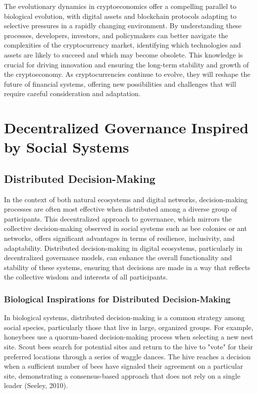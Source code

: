 \documentclass[12pt,twoside]{article}
\begin{document}
The evolutionary dynamics in cryptoeconomics offer a compelling parallel to biological evolution, with digital assets and blockchain protocols adapting to selective pressures in a rapidly changing environment. By understanding these processes, developers, investors, and policymakers can better navigate the complexities of the cryptocurrency market, identifying which technologies and assets are likely to succeed and which may become obsolete. This knowledge is crucial for driving innovation and ensuring the long-term stability and growth of the cryptoeconomy. As cryptocurrencies continue to evolve, they will reshape the future of financial systems, offering new possibilities and challenges that will require careful consideration and adaptation.

\section{Decentralized Governance Inspired by Social Systems}

\subsection{Distributed Decision-Making}

In the context of both natural ecosystems and digital networks, decision-making processes are often most effective when distributed among a diverse group of participants. This decentralized approach to governance, which mirrors the collective decision-making observed in social systems such as bee colonies or ant networks, offers significant advantages in terms of resilience, inclusivity, and adaptability. Distributed decision-making in digital ecosystems, particularly in decentralized governance models, can enhance the overall functionality and stability of these systems, ensuring that decisions are made in a way that reflects the collective wisdom and interests of all participants.

\subsubsection{Biological Inspirations for Distributed Decision-Making}

In biological systems, distributed decision-making is a common strategy among social species, particularly those that live in large, organized groups. For example, honeybees use a quorum-based decision-making process when selecting a new nest site. Scout bees search for potential sites and return to the hive to "vote" for their preferred locations through a series of waggle dances. The hive reaches a decision when a sufficient number of bees have signaled their agreement on a particular site, demonstrating a consensus-based approach that does not rely on a single leader (Seeley, 2010).
\end{document}
